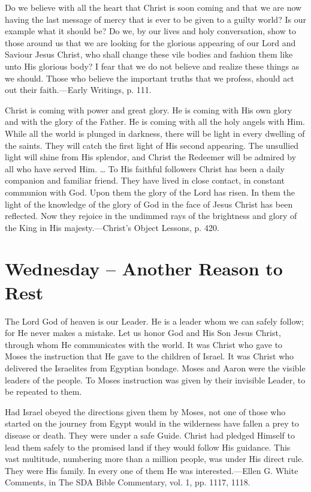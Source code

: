 \documentclass[a4paper, 10pt, twoside, headings=small]{scrartcl}
\begin{document}
\begin{multicols}{2}
Do we believe with all the heart that Christ is soon coming and that we are now having the last message of mercy that is ever to be given to a guilty world? Is our example what it should be? Do we, by our lives and holy conversation, show to those around us that we are looking for the glorious appearing of our Lord and Saviour Jesus Christ, who shall change these vile bodies and fashion them like unto His glorious body? I fear that we do not believe and realize these things as we should. Those who believe the important truths that we profess, should act out their faith.—Early Writings, p. 111.

Christ is coming with power and great glory. He is coming with His own glory and with the glory of the Father. He is coming with all the holy angels with Him. While all the world is plunged in darkness, there will be light in every dwelling of the saints. They will catch the first light of His second appearing. The unsullied light will shine from His splendor, and Christ the Redeemer will be admired by all who have served Him. … To His faithful followers Christ has been a daily companion and familiar friend. They have lived in close contact, in constant communion with God. Upon them the glory of the Lord has risen. In them the light of the knowledge of the glory of God in the face of Jesus Christ has been reflected. Now they rejoice in the undimmed rays of the brightness and glory of the King in His majesty.—Christ’s Object Lessons, p. 420.

\section*{Wednesday – Another Reason to Rest}

The Lord God of heaven is our Leader. He is a leader whom we can safely follow; for He never makes a mistake. Let us honor God and His Son Jesus Christ, through whom He communicates with the world. It was Christ who gave to Moses the instruction that He gave to the children of Israel. It was Christ who delivered the Israelites from Egyptian bondage. Moses and Aaron were the visible leaders of the people. To Moses instruction was given by their invisible Leader, to be repeated to them.

Had Israel obeyed the directions given them by Moses, not one of those who started on the journey from Egypt would in the wilderness have fallen a prey to disease or death. They were under a safe Guide. Christ had pledged Himself to lead them safely to the promised land if they would follow His guidance. This vast multitude, numbering more than a million people, was under His direct rule. They were His family. In every one of them He was interested.—Ellen G. White Comments, in The SDA Bible Commentary, vol. 1, pp. 1117, 1118.


\end{multicols}
\end{document}
